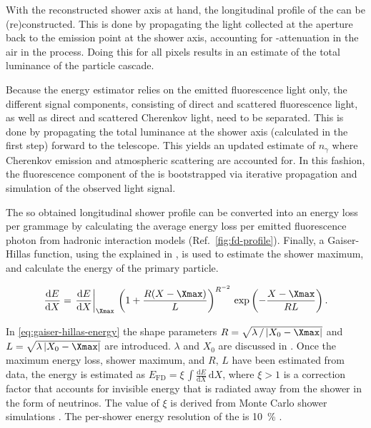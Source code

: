 With the reconstructed shower axis at hand, the longitudinal profile of the 
\EAS can be (re)constructed. This is done by propagating the light collected at
the \FD aperture back to the emission point at the shower axis, accounting for 
\UV-attenuation in the air in the process. Doing this for all pixels results in
an estimate of the total luminance of the particle cascade. 

Because the energy estimator relies on the emitted fluorescence light only, 
the different signal components, consisting of direct and scattered 
fluorescence light, as well as direct and scattered Cherenkov light, need to be
separated. This is done by propagating the total luminance at the shower axis 
(calculated in the first step) forward to the telescope. This yields an updated
estimate of $n_\gamma$ where Cherenkov emission and atmospheric scattering are
accounted for. In this fashion, the fluorescence component of the \EAS is 
bootstrapped via iterative propagation and simulation of the observed light 
signal.

The so obtained longitudinal shower profile can be converted into an energy 
loss per grammage by calculating the average energy loss per emitted 
fluorescence photon from hadronic interaction models (Ref.\ 
\cref{fig:fd-profile}). Finally, a Gaiser-Hillas function, using the \USP 
explained in \cite{bellidoShowerProfileFitting2022}, is used to estimate the 
shower maximum, and calculate the energy of the primary particle.

\begin{equation}
\label{eq:gaiser-hillas-energy}
\frac{\mathrm{d}E}{\mathrm{d}X} = \left.\frac{\mathrm{d}E}{\mathrm{d}X}\right\vert_{\Xmax}\,\left( 1 + \frac{R(X-\Xmax)}{L}\right)^{R^{-2}}\,\exp\left(-\frac{X-\Xmax}{RL} \right).
\end{equation}

In \cref{eq:gaiser-hillas-energy} the shape parameters 
$R = \sqrt{\lambda\,/\,|X_0-\Xmax|}$ and $L = \sqrt{\lambda\,|X_0-\Xmax|}$ are
introduced. $\lambda$ and $X_0$ are discussed in 
\cite{hillasCosmicRaysCommonwealth2013}. Once the maximum energy loss, shower
maximum, and $R,\,L$ have been estimated from data, the energy is estimated as
$E_\mathrm{FD} = \xi\,\int\frac{\mathrm{d}E}{\mathrm{d}X}\,\mathrm{d}X$, where
$\xi>1$ is a correction factor that accounts for invisible energy that is 
radiated away from the shower in the form of neutrinos. The value of $\xi$ is 
derived from Monte Carlo shower simulations 
\cite{barbosaDeterminationCalorimetricEnergy2004}. The per-shower energy 
resolution of the \FD is \SI{10}{\percent} 
\cite{abrahamFluorescenceDetectorPierre2010}.

